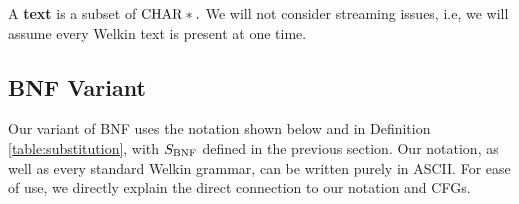 


A \textbf{text} is a subset of $\mathrm{CHAR}*.$ We will not consider streaming issues, i.e, we will assume every Welkin text is present at one time.

\subsection{BNF Variant}
Our variant of BNF uses the notation shown below and in Definition \ref{table:substitution}, with $S_{\mathrm{BNF}}$ defined in the previous section. Our notation, as well as every standard Welkin grammar, can be written purely in ASCII. For ease of use, we directly explain the direct connection to our notation and CFGs.

